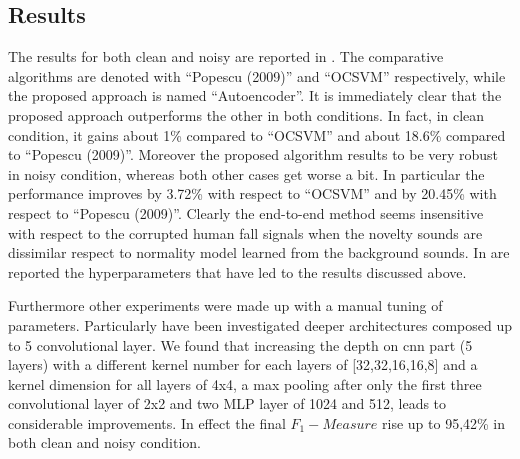 \subsection{Results}
The results for both clean and noisy are reported in . The comparative algorithms are denoted with ``Popescu (2009)'' and ``OCSVM'' respectively, while the proposed approach is named ``Autoencoder''. It is immediately clear that the proposed approach outperforms the other in both conditions. In fact, in clean condition, it gains about 1\% compared to ``OCSVM'' and about 18.6\% compared to ``Popescu (2009)''. Moreover the proposed algorithm results to be very robust in noisy condition, %
whereas both other cases get worse a bit.
In particular the performance improves by 3.72\% with respect to ``OCSVM'' and by 20.45\% with respect to ``Popescu (2009)''. Clearly the end-to-end method seems insensitive with respect to the corrupted human fall signals when the novelty sounds are dissimilar respect to normality model learned from the background sounds. 
In  are reported the hyperparameters that have led to the results discussed above.

Furthermore other experiments were made up with a manual tuning of parameters. Particularly have been investigated deeper architectures composed up to 5 convolutional layer. We found that increasing the depth on cnn part (5 layers) with a different kernel number for each layers of [32,32,16,16,8] and a kernel dimension for all layers of 4x4, a max pooling after only the first three convolutional layer of 2x2 and two MLP layer of 1024 and 512, leads to considerable improvements. In effect the final $ F_1 -Measure$ rise up to 95,42\%  in both clean and noisy condition. 


